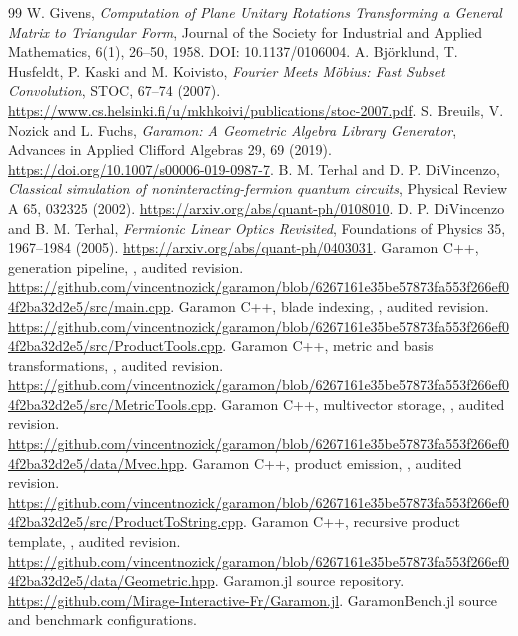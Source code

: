 \documentclass[11pt,a4paper]{article}
\begin{document}
\begin{thebibliography}{99}
 W. Givens, \emph{Computation of Plane Unitary
Rotations Transforming a General Matrix to Triangular Form},
Journal of the Society for Industrial and Applied Mathematics,
6(1), 26--50, 1958. DOI: 10.1137/0106004.
 A. Bj\"orklund, T. Husfeldt, P. Kaski and
M. Koivisto, \emph{Fourier Meets M\"obius: Fast Subset Convolution},
STOC, 67--74 (2007).
\url{https://www.cs.helsinki.fi/u/mkhkoivi/publications/stoc-2007.pdf}.
 S. Breuils, V. Nozick and L. Fuchs,
\emph{Garamon: A Geometric Algebra Library Generator},
Advances in Applied Clifford Algebras 29, 69 (2019).
\url{https://doi.org/10.1007/s00006-019-0987-7}.
 B. M. Terhal and D. P. DiVincenzo,
\emph{Classical simulation of noninteracting-fermion quantum circuits},
Physical Review A 65, 032325 (2002).
\url{https://arxiv.org/abs/quant-ph/0108010}.
 D. P. DiVincenzo and B. M. Terhal,
\emph{Fermionic Linear Optics Revisited},
Foundations of Physics 35, 1967--1984 (2005).
\url{https://arxiv.org/abs/quant-ph/0403031}.
 Garamon C++, generation pipeline,
, audited revision.
\url{https://github.com/vincentnozick/garamon/blob/6267161e35be57873fa553f266ef04f2ba32d2e5/src/main.cpp}.
 Garamon C++, blade indexing,
, audited revision.
\url{https://github.com/vincentnozick/garamon/blob/6267161e35be57873fa553f266ef04f2ba32d2e5/src/ProductTools.cpp}.
 Garamon C++, metric and basis transformations,
, audited revision.
\url{https://github.com/vincentnozick/garamon/blob/6267161e35be57873fa553f266ef04f2ba32d2e5/src/MetricTools.cpp}.
 Garamon C++, multivector storage,
, audited revision.
\url{https://github.com/vincentnozick/garamon/blob/6267161e35be57873fa553f266ef04f2ba32d2e5/data/Mvec.hpp}.
 Garamon C++, product emission,
, audited revision.
\url{https://github.com/vincentnozick/garamon/blob/6267161e35be57873fa553f266ef04f2ba32d2e5/src/ProductToString.cpp}.
 Garamon C++, recursive product template,
, audited revision.
\url{https://github.com/vincentnozick/garamon/blob/6267161e35be57873fa553f266ef04f2ba32d2e5/data/Geometric.hpp}.
 Garamon.jl source repository.
\url{https://github.com/Mirage-Interactive-Fr/Garamon.jl}.
 GaramonBench.jl source and benchmark
configurations.

\end{thebibliography}
\end{document}
